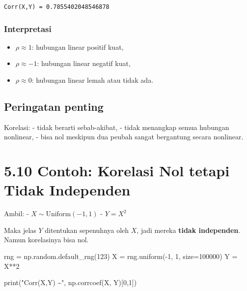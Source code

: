 \documentclass[
  letterpaper,
  DIV=11,
  numbers=noendperiod]{scrreprt}
\newenvironment{Shaded}{\begin{snugshade}}{\end{snugshade}}
\newcommand{\BuiltInTok}[1]{\textcolor[rgb]{0.00,0.23,0.31}{#1}}
\newcommand{\DecValTok}[1]{\textcolor[rgb]{0.68,0.00,0.00}{#1}}
\newcommand{\NormalTok}[1]{\textcolor[rgb]{0.00,0.23,0.31}{#1}}
\newcommand{\OperatorTok}[1]{\textcolor[rgb]{0.37,0.37,0.37}{#1}}
\newcommand{\StringTok}[1]{\textcolor[rgb]{0.13,0.47,0.30}{#1}}
\providecommand{\tightlist}{%
  \setlength{\itemsep}{0pt}\setlength{\parskip}{0pt}}
\begin{document}
\begin{verbatim}
Corr(X,Y) = 0.7855402048546878
\end{verbatim}

\subsubsection{Interpretasi}\label{interpretasi-20}

\begin{itemize}
\tightlist
\item
  \(\rho \approx 1\): hubungan linear positif kuat,
\item
  \(\rho \approx -1\): hubungan linear negatif kuat,
\item
  \(\rho \approx 0\): hubungan linear lemah atau tidak ada.
\end{itemize}

\subsection{Peringatan penting}\label{peringatan-penting}

Korelasi: - tidak berarti sebab-akibat, - tidak menangkap semua hubungan
nonlinear, - bisa nol meskipun dua peubah sangat bergantung secara
nonlinear.

\section{5.10 Contoh: Korelasi Nol tetapi Tidak
Independen}\label{contoh-korelasi-nol-tetapi-tidak-independen}

Ambil: - \(X \sim \mathrm{Uniform}(-1,1)\) - \(Y = X^2\)

Maka jelas \(Y\) ditentukan sepenuhnya oleh \(X\), jadi mereka
\textbf{tidak independen}. Namun korelasinya bisa nol.

\begin{Shaded}
\begin{Highlighting}[]
\NormalTok{rng }\OperatorTok{=}\NormalTok{ np.random.default\_rng(}\DecValTok{123}\NormalTok{)}
\NormalTok{X }\OperatorTok{=}\NormalTok{ rng.uniform(}\OperatorTok{{-}}\DecValTok{1}\NormalTok{, }\DecValTok{1}\NormalTok{, size}\OperatorTok{=}\DecValTok{100000}\NormalTok{)}
\NormalTok{Y }\OperatorTok{=}\NormalTok{ X}\OperatorTok{**}\DecValTok{2}

\BuiltInTok{print}\NormalTok{(}\StringTok{"Corr(X,Y) \textasciitilde{}"}\NormalTok{, np.corrcoef(X, Y)[}\DecValTok{0}\NormalTok{,}\DecValTok{1}\NormalTok{])}
\end{Highlighting}
\end{Shaded}
\end{document}
